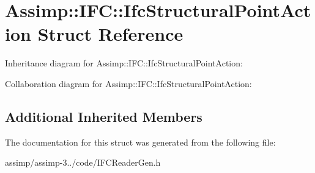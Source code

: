 \hypertarget{struct_assimp_1_1_i_f_c_1_1_ifc_structural_point_action}{\section{Assimp\+:\+:I\+F\+C\+:\+:Ifc\+Structural\+Point\+Action Struct Reference}
\label{struct_assimp_1_1_i_f_c_1_1_ifc_structural_point_action}
}


Inheritance diagram for Assimp\+:\+:I\+F\+C\+:\+:Ifc\+Structural\+Point\+Action\+:


Collaboration diagram for Assimp\+:\+:I\+F\+C\+:\+:Ifc\+Structural\+Point\+Action\+:
\subsection*{Additional Inherited Members}


The documentation for this struct was generated from the following file\+:\begin{DoxyCompactItemize}
\item 
assimp/assimp-\/3../code/I\+F\+C\+Reader\+Gen.\+h\end{DoxyCompactItemize}
